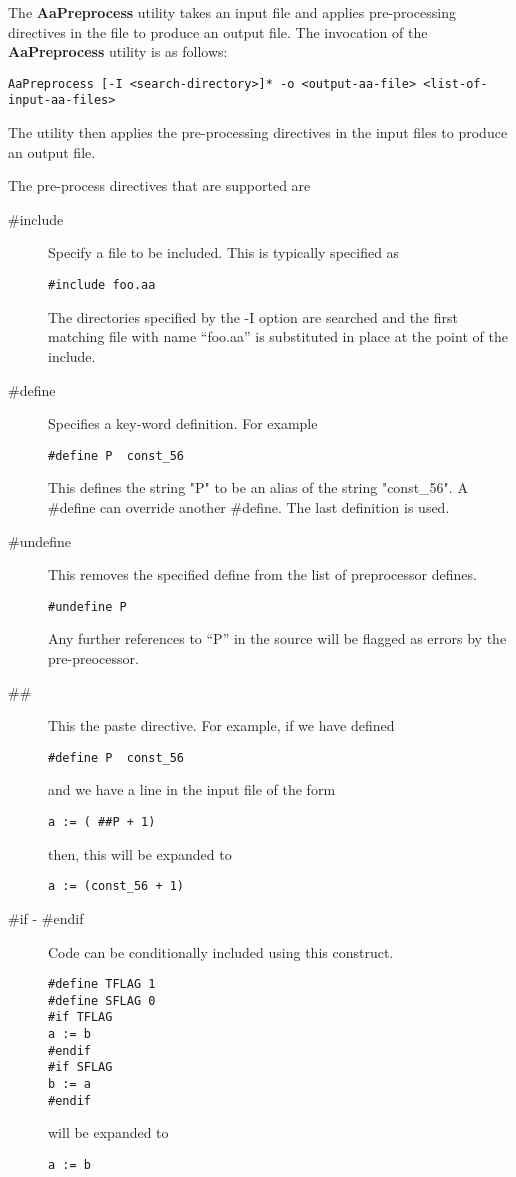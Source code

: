 The {\bf AaPreprocess} utility takes an input \Aa file and applies pre-processing
directives in the file  to produce an output \Aa file.   The invocation of the
{\bf AaPreprocess} utility is as follows:
\begin{verbatim}
AaPreprocess [-I <search-directory>]* -o <output-aa-file> <list-of-input-aa-files>
\end{verbatim}

The utility then applies the pre-processing directives in the input \Aa files
to produce an output \Aa file.

The pre-process directives that are supported are
\begin{description}
\item[\#include]  Specify a file to be included.  This is typically specified
as 
\begin{verbatim}
#include foo.aa
\end{verbatim}
The directories specified by the -I option are searched and the first
matching file with name ``foo.aa'' is substituted in place at the point
of the include.
\item[\#define]  Specifies a key-word definition.  For example
\begin{verbatim}
#define P  const_56
\end{verbatim}
This defines the  string "P" to be an alias of the string "const\_56".
A \#define can override another \#define.  The last definition is used.
\item[\#undefine]  This removes the specified define from the list
of preprocessor defines.
\begin{verbatim}
#undefine P
\end{verbatim}
Any further references to ``P'' in the source will be
flagged as errors by the pre-preocessor.
\item[\#\#]  This the paste directive.   For example, if we have
defined
\begin{verbatim}
#define P  const_56
\end{verbatim}
and we have a line in the input file of the form
\begin{verbatim}
a := ( ##P + 1)
\end{verbatim}
then, this will be expanded to
\begin{verbatim}
a := (const_56 + 1)
\end{verbatim}
\item [\#if - \#endif] 
Code can be conditionally included using this construct.
\begin{verbatim}
#define TFLAG 1
#define SFLAG 0
#if TFLAG
a := b
#endif 
#if SFLAG
b := a
#endif
\end{verbatim}
will be expanded to
\begin{verbatim}
a := b
\end{verbatim}
\end{description}

